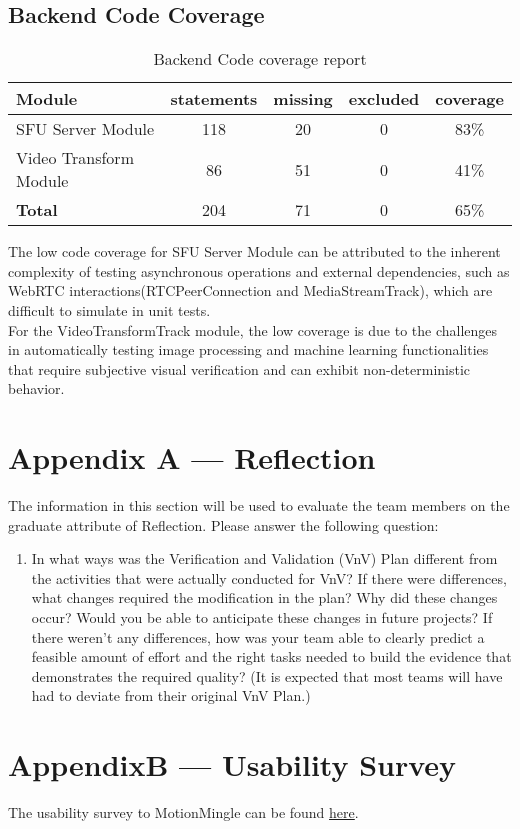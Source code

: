 \documentclass[12pt, titlepage]{article}
\begin{document}
\subsection*{Backend Code Coverage}

\begin{table}[htbp]
  \centering
  \begin{tabular}{@{}lcccc@{}}
  \toprule
  \textbf{Module}                   & \textbf{statements} & \textbf{missing} & \textbf{excluded} & \textbf{coverage} \\ \midrule
  SFU Server Module                 & 118                 & 20               & 0                 & 83\%              \\
  Video Transform Module            & 86                  & 51               & 0                 & 41\%              \\ \midrule
  \textbf{Total}                    & 204                 & 71               & 0                 & 65\%              \\ \bottomrule
  \end{tabular}
  \caption{Backend Code coverage report}
  \label{tab:my-table}
\end{table}
The low code coverage for SFU Server Module can be attributed to the inherent complexity of testing asynchronous operations and external dependencies, such as WebRTC interactions(RTCPeerConnection and MediaStreamTrack), which are difficult to simulate in unit tests.\\
For the VideoTransformTrack module, the low coverage is due to the challenges in automatically testing image processing and machine learning functionalities that require subjective visual verification and can exhibit non-deterministic behavior.

\newpage{}
\section*{Appendix A --- Reflection}

The information in this section will be used to evaluate the team members on the
graduate attribute of Reflection.  Please answer the following question:

\begin{enumerate}
  \item In what ways was the Verification and Validation (VnV) Plan different
  from the activities that were actually conducted for VnV?  If there were
  differences, what changes required the modification in the plan?  Why did
  these changes occur?  Would you be able to anticipate these changes in future
  projects?  If there weren't any differences, how was your team able to clearly
  predict a feasible amount of effort and the right tasks needed to build the
  evidence that demonstrates the required quality?  (It is expected that most
  teams will have had to deviate from their original VnV Plan.)
\end{enumerate}

\section*{AppendixB --- Usability Survey}
The usability survey to MotionMingle can be found \href{https://docs.google.com/forms/d/e/1FAIpQLSchSdc_kHr98yHP8QPyWItHoP-dj_hJnuEtNByH0V2M_iDjWw/viewform}{here}.
\end{document}
